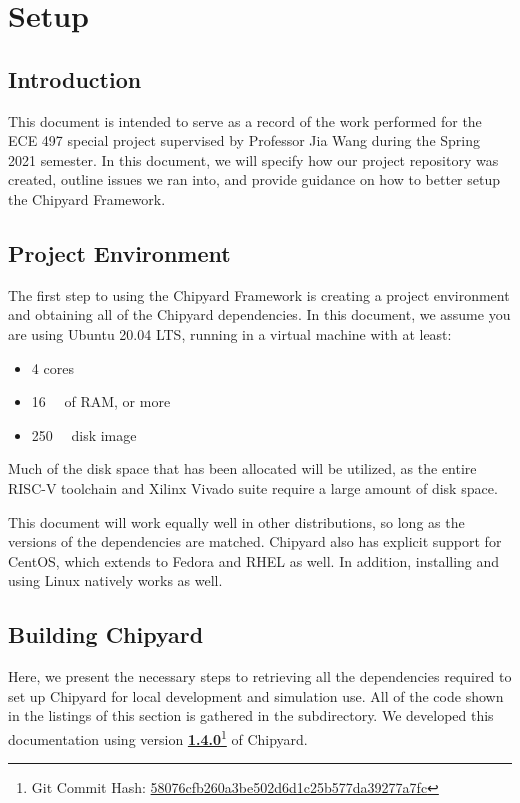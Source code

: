 \chapter{Setup}\label{chap:Setup}
\section{Introduction}\label{sec:Introduction}
This document is intended to serve as a record of the work performed for the ECE 497 special project supervised by Professor Jia Wang during the Spring 2021 semester.
In this document, we will specify how our project repository was created, outline issues we ran into, and provide guidance on how to better setup the Chipyard Framework.

\section{Project Environment}\label{chap:Project_Environment}
The first step to using the Chipyard Framework is creating a project environment and obtaining all of the Chipyard dependencies.
In this document, we assume you are using Ubuntu 20.04 LTS, running in a virtual machine with at least:
\begin{itemize}
\item 4 cores
\item \SI{16}{\giga\byte} of RAM, or more
\item \SI{250}{\giga\byte} disk image
\end{itemize}

Much of the disk space that has been allocated will be utilized, as the entire RISC-V toolchain and Xilinx Vivado suite require a large amount of disk space.

This document will work equally well in other distributions, so long as the versions of the dependencies are matched.
Chipyard also has explicit support for CentOS, which extends to Fedora and RHEL as well.
In addition, installing and using Linux natively works as well.

\section{Building Chipyard}\label{sec:Building_Chipyard}
Here, we present the necessary steps to retrieving all the dependencies required to set up Chipyard for local development and simulation use.
All of the code shown in the listings of this section is gathered in the  subdirectory.
We developed this documentation using version \href{https://github.com/ucb-bar/chipyard/releases/tag/1.4.0}{\textbf{1.4.0}}\footnote{Git Commit Hash: \href{https://github.com/ucb-bar/chipyard/commit/58076cfb260a3be502d6d1c25b577da39277a7fc}{58076cfb260a3be502d6d1c25b577da39277a7fc}} of Chipyard.

